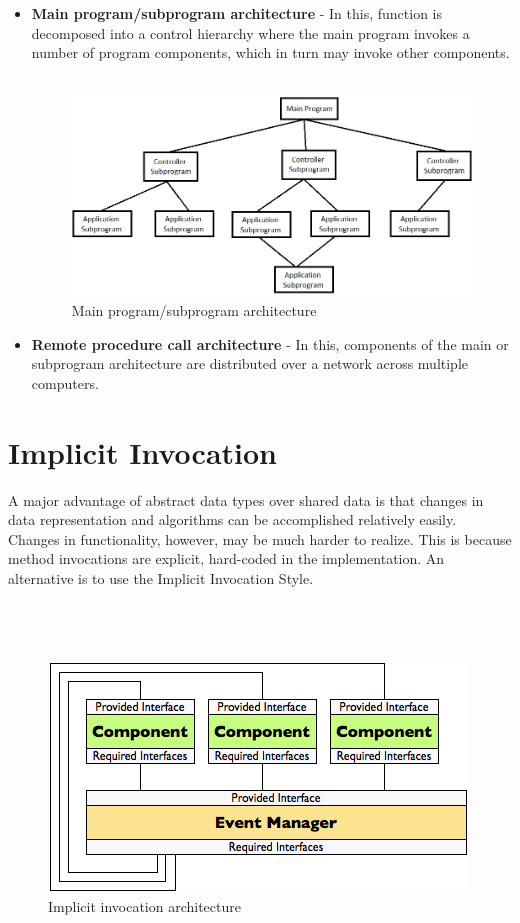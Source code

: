 \documentclass{article}
\begin{document}
\begin{itemize}

\item \textbf{Main program/subprogram architecture} - In this, function is decomposed into a control hierarchy where the main program invokes a number of program components, which in turn may invoke other components.\\\\

\begin{figure}[h]
\centering
\includegraphics[scale=0.5]{c&r.jpg}
\caption{Main program/subprogram architecture}
\label{fig_c&r}
\end{figure}


\item \textbf{Remote procedure call architecture} - In this, components of the main or subprogram architecture are distributed over a network across multiple computers.

\end{itemize}
\newpage


\section{Implicit Invocation}
A major advantage of abstract data types over shared data is that changes in data representation and algorithms can be accomplished relatively easily. Changes in functionality, however, may be much harder to realize. This is because method invocations are explicit, hard-coded in the implementation. An alternative is to use the Implicit Invocation Style.\\\\\\\


\begin{figure}[h]
\centering
\includegraphics[scale=1]{ii.png}
\caption{Implicit invocation architecture}
\label{fig_ii}
\end{figure}
\end{document}
